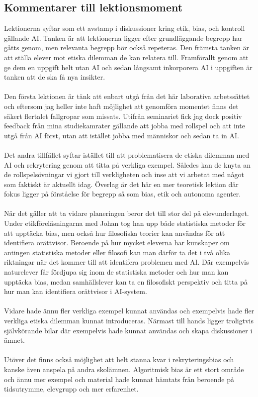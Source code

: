 \documentclass[12pt]{article}
\begin{document}
\break
\subsection*{Kommentarer till lektionsmoment}

Lektionerna syftar som ett avstamp i diskussioner kring etik, bias, och kontroll gällande AI. Tanken är att lektionerna ligger
efter grundläggande begrepp har gåtts genom, men relevanta begrepp bör också repeteras. Den främsta tanken är att ställa elever mot
etiska dilemman de kan relatera till. Framförallt genom att ge dem en uppgift helt utan AI och sedan långsamt inkorporera AI
i uppgiften är tanken att de ska få nya insikter.
\\ \\
Den första lektionen är tänk att enbart utgå från det här laborativa arbetssättet och eftersom jag heller inte haft möjlighet att genomföra momentet
finns det säkert flertalet fallgropar som missats. Utifrån seminariet fick jag dock positiv feedback från mina studiekamrater gällande att jobba med rollspel
och att inte utgå från AI först, utan att istället jobba med människor och sedan ta in AI.
\\ \\
Det andra tillfället syftar istället till att problematisera de etiska dilemman med AI och rekrytering genom att titta på verkliga exempel. Således kan de knyta an
de rollspelsövningar vi gjort till verkligheten och inse att vi arbetat med något som faktiskt är aktuellt idag. Överlag är det här en mer teoretisk lektion där fokus ligger
på förståelse för begrepp så som bias, etik och autonoma agenter.
\\ \\
När det gäller att ta vidare planeringen beror det till stor del på elevunderlaget. Under etikföreläsningarna med Johan tog han upp både statistiska metoder för att upptäcka bias,
men också hur filosofiska teorier kan användas för att identifiera orättvisor. Beroende på hur mycket eleverna har kunskaper om antingen statistiska metoder eller filosofi kan man därför ta det
i två olika riktningar när det kommer till att identifera problemen med AI. Där exempelvis naturelever får fördjupa sig inom de statistiska metoder och hur man kan upptäcka bias,
medan samhällslever kan ta en filosofiskt perspektiv och titta på hur man kan identifiera orättvisor i AI-system.
\\ \\
Vidare hade ännu fler verkliga exempel kunnat användas och exempelvis hade fler verkliga etiska dilemman kunnat introduceras. Närmast till hands ligger troligtvis
självkörande bilar där exempelvis \textcite{moralmachine} hade kunnat användas och skapa diskussioner i ämnet.
\\ \\
Utöver det finns också möjlighet att helt stanna kvar i rekryteringsbias och kanske även anspela på andra skolämnen. Algoritmisk bias är ett stort område och ännu mer exempel och material hade kunnat hämtats från \textcite{barocas2023fairness}
beroende på tidsutrymme, elevgrupp och mer erfarenhet.
\end{document}
